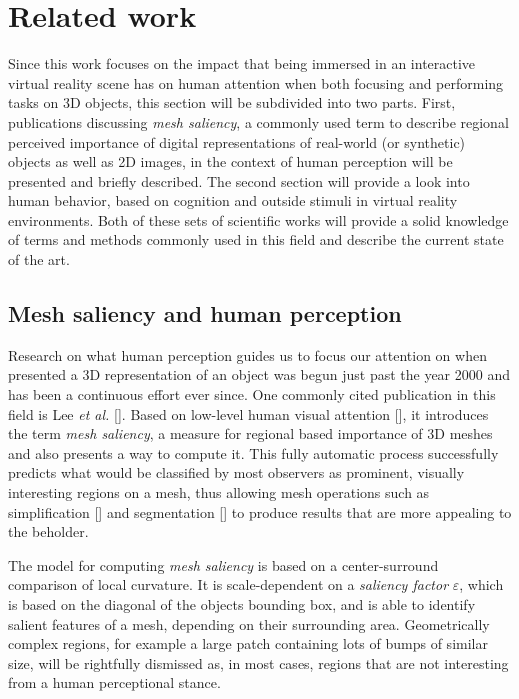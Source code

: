 \chapter{Related work}

Since this work focuses on the impact that being immersed in an interactive virtual reality scene has on human attention when both focusing and performing tasks on 3D objects, this section will be subdivided into two parts.
First, publications discussing \textit{mesh saliency}, a commonly used term to describe regional perceived importance of digital representations of real-world (or synthetic) objects as well as 2D images, in the context of human perception will be presented and briefly described. The second section will provide a look into human behavior, based on cognition and outside stimuli in virtual reality environments. Both of these sets of scientific works will provide a solid knowledge of terms and methods commonly used in this field and describe the current state of the art.

\section{Mesh saliency and human perception}

Research on what human perception guides us to focus our attention on when presented a 3D representation of an object was begun just past the year 2000 and has been a continuous effort ever since. One commonly cited publication in this field is Lee \textit{et al.} [\cite{lee2005mesh}]. Based on low-level human visual attention [\cite{koch1987shifts}], it introduces the term \textit{mesh saliency}, a measure for regional based importance of 3D meshes and also presents a way to compute it. This fully automatic process successfully predicts  what would be classified by most observers as prominent, visually interesting regions on a mesh, thus allowing mesh operations such as simplification [\cite{cignoni1998comparison}] and segmentation [\cite{shamir2008survey}] to produce results that are more appealing to the beholder.

The model for computing \textit{mesh saliency} is based on a center-surround comparison of local curvature. It is scale-dependent on a \textit{saliency factor} $\varepsilon$, which is based on the diagonal of the objects bounding box, and is able to identify salient features of a mesh, depending on their surrounding area. Geometrically complex regions, for example a large patch containing lots of bumps of similar size, will be rightfully dismissed as, in most cases, regions that are not interesting from a human perceptional stance.

